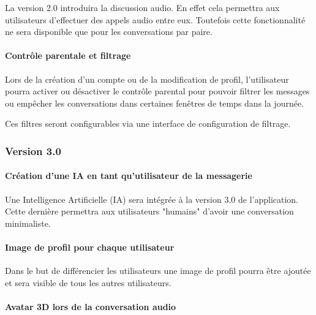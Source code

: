 \par La version 2.0  introduira la discussion audio. En effet cela permettra aux utilisateurs d’effectuer des appels audio entre eux. Toutefois cette fonctionnalité ne sera disponible que pour les conversations par paire.

\paragraph{Contrôle parentale et filtrage\newline}

\par Lors de la création d’un compte ou de la modification de profil, l’utilisateur pourra activer ou désactiver le contrôle parental pour pouvoir filtrer les messages ou empêcher les conversations dans certaines fenêtres de temps dans la journée.

\par Ces filtres seront configurables via une interface de configuration de filtrage.

\subsubsection{Version 3.0}

\paragraph{Création d’une IA en tant qu’utilisateur de la messagerie\newline}

\par Une Intelligence Artificielle (IA) sera intégrée à la version 3.0 de l’application. Cette dernière permettra aux utilisateurs "humains" d’avoir une conversation minimaliste.

\paragraph{Image de profil pour chaque utilisateur\newline}

\par Dans le but de différencier les utilisateurs une image de profil pourra être ajoutée et sera visible de tous les autres utilisateurs.

\paragraph{Avatar 3D lors de la conversation audio\newline}

